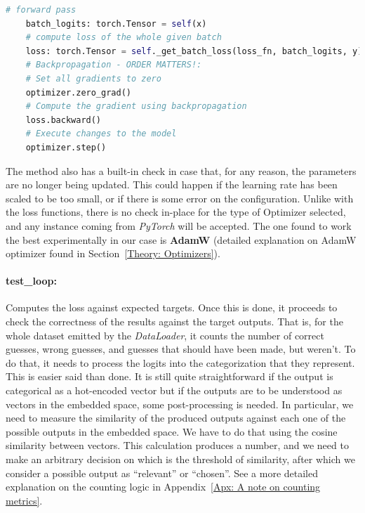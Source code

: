 \documentclass[a4paper, 11pt]{report}
\begin{document}
    \begin{minipage}{\linewidth}
    \begin{lstlisting}[language=Python, title=From the implementation of train\_loop method: Core of the training step, caption= Key function calls in the training step that compute and apply the changes to be done to the NN parameters. (with some comments added for clarity),label=Listing: core training ]
    # forward pass
    batch_logits: torch.Tensor = self(x)
    # compute loss of the whole given batch
    loss: torch.Tensor = self._get_batch_loss(loss_fn, batch_logits, y)
    # Backpropagation - ORDER MATTERS!:
    # Set all gradients to zero
    optimizer.zero_grad()
    # Compute the gradient using backpropagation
    loss.backward()
    # Execute changes to the model
    optimizer.step()
    \end{lstlisting}
    \end{minipage}

    The method also has a built-in check in case that, for any reason, the parameters are no longer being updated. This could happen if the learning rate has been scaled to be too small, or if there is some error on the configuration. Unlike with the loss functions, there is no check in-place for the type of Optimizer selected, and any instance coming from \textit{PyTorch} will be accepted. The one found to work the best experimentally in our case is \textbf{AdamW} (detailed explanation on AdamW optimizer found in Section~\ref{Theory: Optimizers}).

    \paragraph{test\_loop:} Computes the loss against expected targets. Once this is done, it proceeds to check the correctness of the results against the target outputs. That is, for the whole dataset emitted by the \textit{DataLoader}, it counts the number of correct guesses, wrong guesses, and guesses that should have been made, but weren't. To do that, it needs to process the logits into the categorization that they represent. This is easier said than done. It is still quite straightforward if the output is categorical as a hot-encoded vector but if the outputs are to be understood as vectors in the embedded space, some post-processing is needed. In particular, we need to measure the similarity of the produced outputs against each one of the possible outputs in the embedded space. We have to do that using the cosine similarity between vectors. This calculation produces a number, and we need to make an arbitrary decision on which is the threshold of similarity, after which we consider a possible output as ``relevant'' or ``chosen''.  See a more detailed explanation on the counting logic in Appendix~\ref{Apx: A note on counting metrics}.
\end{document}
